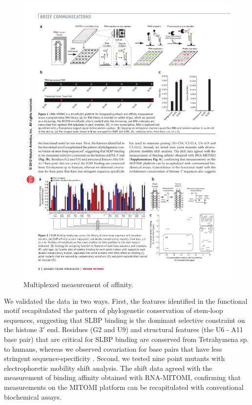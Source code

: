\begin{figure}
\center\includegraphics[width=150mm,scale=0.5]{Figures/Fig29}
\caption{Multiplexed measurement of affinity.}
\label{fig:Fig29}
\end{figure} 
 
 We validated the data in two ways. First, the features identified in the functional motif recapitulated the pattern of phylogenetic conservation of stem-loop sequences, suggesting that SLBP binding is the dominant selective constraint on the histone 3$'$ end. Residues (G2 and U9) and structural features (the U6 - A11 base pair) that are critical for SLBP binding are conserved from Tetrahymena sp. to humans, whereas we observed covariation for base pairs that have less stringent sequence-specificity \cite{Marzluff:2008fy}. Second, we tested nine point mutants with electrophoretic mobility shift analysis. The shift data agreed with the measurement of binding affinity obtained with RNA-MITOMI, confirming that measurements on the MITOMI platform can be recapitulated with conventional biochemical assays.
 
